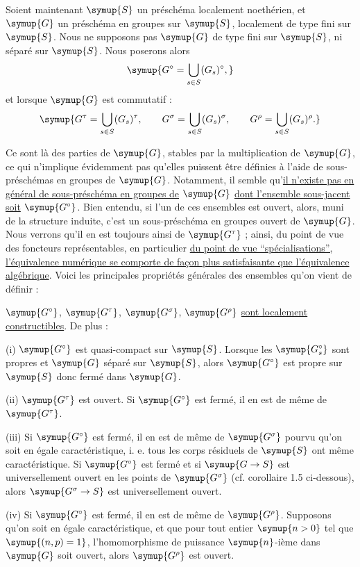 Soient maintenant $\symup{S}$ un préschéma localement noethérien, et $\symup{G}$ un préschéma
en groupes sur $\symup{S}$, localement de type fini sur $\symup{S}$. Nous ne supposons pas $\symup{G}$
de type fini sur $\symup{S}$, ni séparé sur $\symup{S}$. Nous poserons alors
\[
\symup{G^\circ=\bigcup\limits_{s\in S}(G_s)^\circ,}
\]
et lorsque $\symup{G}$ est commutatif :
\[
\symup{G^\tau=\bigcup\limits_{s\in S}(G_s)^\tau,
\qquad
G^\sigma=\bigcup\limits_{s\in S}(G_s)^\sigma,
\qquad
G^\rho=\bigcup\limits_{s\in S}(G_s)^\rho.}
\]

Ce sont là des parties de $\symup{G}$, stables par la multiplication de $\symup{G}$, ce qui
n'implique évidemment pas qu'elles puissent être définies à l'aide de
sous-préschémas en groupes de $\symup{G}$. Notamment, il semble qu'\uline{il n'existe pas en général de sous-préschéma en groupes de} $\symup{G}$ \uline{dont l'ensemble sous-jacent soit} $\symup{G^\circ}$. Bien entendu, si l'un de ces ensembles est ouvert, alors, muni de la
structure induite, c'est un sous-préschéma en groupes ouvert de $\symup{G}$. Nous
verrons qu'il en est toujours ainsi de $\symup{G^\tau}$ ; ainsi, du point de vue des
foncteurs représentables, en particulier \uline{du point de vue ``spécialisations'', l'équivalence numérique se comporte de façon plus satisfaisante que l'équivalence algébrique}. Voici les principales propriétés générales des
ensembles qu'on vient de définir :

 $\symup{G^\circ}$, $\symup{G^\tau}$, $\symup{G^\sigma}$, $\symup{G^\rho}$ \uline{sont localement constructibles}. De plus :

\noindent (i) $\symup{G^\circ}$ est quasi-compact sur $\symup{S}$. Lorsque les $\symup{G_s^\circ}$
sont propres et $\symup{G}$ séparé sur $\symup{S}$, alors $\symup{G^\circ}$ est propre sur $\symup{S}$ donc
fermé dans $\symup{G}$.

\noindent (ii) $\symup{G^\tau}$ est ouvert. Si $\symup{G^\circ}$ est fermé, il en est de même
de $\symup{G^\tau}$.

\noindent (iii) Si $\symup{G^\circ}$ est fermé, il en est de même de $\symup{G^\sigma}$ pourvu
qu'on soit en égale caractéristique, i. e. tous les corps résiduels de $\symup{S}$ ont
même caractéristique. Si $\symup{G^\circ}$ est fermé et si $\symup{G\to S}$ est
universellement ouvert en les points de $\symup{G^\sigma}$ (cf. corollaire 1.5
ci-dessous), alors $\symup{G^\sigma\to S}$ est universellement ouvert.

\noindent (iv) Si $\symup{G^\circ}$ est fermé, il en est de même de $\symup{G^\rho}$.
Supposons qu'on soit en égale caractéristique, et que pour tout entier $\symup{n>0}$
tel que $\symup{(n,p)=1}$, l'homomorphisme de puissance $\symup{n}$-ième dans $\symup{G}$ soit ouvert,
alors $\symup{G^\rho}$ est ouvert.

